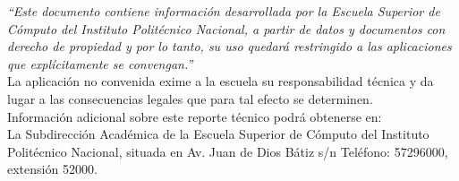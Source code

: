 \filright%
\begin{minipage}{\textwidth}
    \filright%
    \centering
    \begin{tcolorbox}[enhanced,attach boxed title to top center={yshift=-3mm,yshifttext=-1mm},
      colback=blue!5!white,colframe=blue!75!black,colbacktitle=red!80!black,
      title=\textbf{Advertencia},fonttitle=\bfseries,
      boxed title style={size=small,colframe=red!50!black} ]
    \textit{“Este documento contiene información desarrollada por la Escuela
    Superior de Cómputo del Instituto Politécnico Nacional, a partir de datos y
    documentos con derecho de propiedad y por lo tanto, su uso quedará
    restringido a las aplicaciones que explícitamente se convengan.”}\\

    La aplicación no convenida exime a la escuela su responsabilidad técnica y
    da lugar a las consecuencias legales que para tal efecto se determinen.\\

    Información adicional sobre este reporte técnico podrá obtenerse en:\\

    La Subdirección Académica de la Escuela Superior de Cómputo del Instituto
    Politécnico Nacional, situada en Av. Juan de Dios Bátiz s/n Teléfono: 57296000, extensión 52000.
    \end{tcolorbox}
\end{minipage}